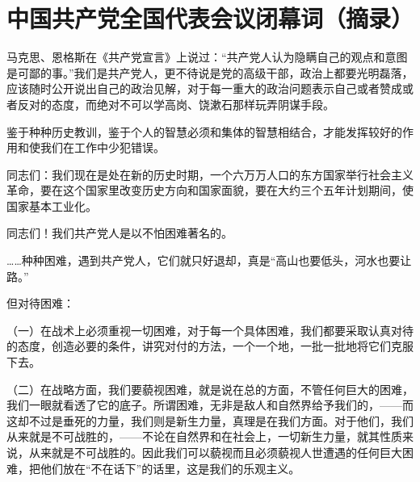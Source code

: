 \section[中国共产党全国代表会议闭幕词（摘录）（一九五五年三月）]{中国共产党全国代表会议闭幕词（摘录）}


马克思、恩格斯在《共产党宣言》上说过：“共产党人认为隐瞒自己的观点和意图是可鄙的事。”我们是共产党人，更不待说是党的高级干部，政治上都要光明磊落，应该随时公开说出自己的政治见解，对于每一重大的政治问题表示自己或者赞成或者反对的态度，而绝对不可以学高岗、饶漱石那样玩弄阴谋手段。

鉴于种种历史教训，鉴于个人的智慧必须和集体的智慧相结合，才能发挥较好的作用和使我们在工作中少犯错误。

同志们：我们现在是处在新的历史时期，一个六万万人口的东方国家举行社会主义革命，要在这个国家里改变历史方向和国家面貌，要在大约三个五年计划期间，使国家基本工业化。

同志们！我们共产党人是以不怕困难著名的。

……种种困难，遇到共产党人，它们就只好退却，真是“高山也要低头，河水也要让路。”

但对待困难：

（一）在战术上必须重视一切困难，对于每一个具体困难，我们都要采取认真对待的态度，创造必要的条件，讲究对付的方法，一个一个地，一批一批地将它们克服下去。

（二）在战略方面，我们要藐视困难，就是说在总的方面，不管任何巨大的困难，我们一眼就看透了它的底子。所谓困难，无非是敌人和自然界给予我们的，——而这却不过是垂死的力量，我们则是新生力量，真理是在我们方面。对于他们，我们从来就是不可战胜的，——不论在自然界和在社会上，一切新生力量，就其性质来说，从来就是不可战胜的。因此我们可以藐视而且必须藐视人世遭遇的任何巨大困难，把他们放在“不在话下”的话里，这是我们的乐观主义。


